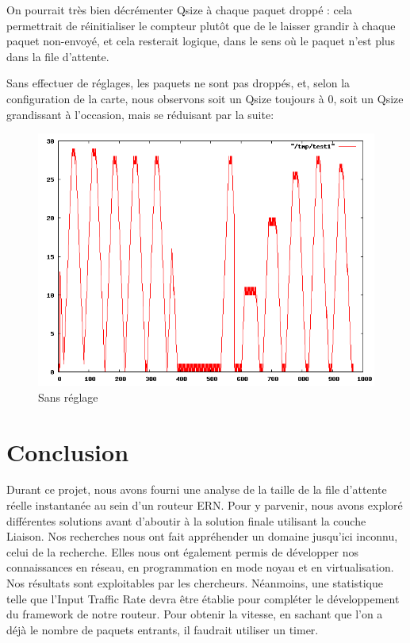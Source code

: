 \documentclass[a4paper]{article}
\begin{document}
On pourrait très bien décrémenter Qsize à chaque paquet droppé : cela
permettrait de réinitialiser le compteur plutôt que de le laisser
grandir à chaque paquet non-envoyé, et cela resterait logique, dans le
sens où le paquet n'est plus dans la file d'attente.

Sans effectuer de  réglages, les paquets ne sont pas droppés, et, selon
la configuration de la carte, nous observons soit un
Qsize toujours à 0, soit un Qsize grandissant à l'occasion, mais se
réduisant par la suite:
\begin{figure}[!ht]
	\centering
	\includegraphics[scale=.5]{qsize_default.png}
	\caption{\label{qsize_default} Sans réglage}
\end{figure}

\section{Conclusion}
Durant ce projet, nous avons fourni une analyse de la taille de la file d'attente
réelle instantanée au sein d'un routeur ERN. Pour y parvenir, nous avons exploré 
différentes solutions avant d'aboutir à la solution finale utilisant la couche Liaison. 
Nos recherches nous ont fait appréhender un domaine jusqu'ici inconnu,
celui de la recherche. Elles nous ont également permis de développer nos connaissances
en réseau, en programmation en mode noyau et en virtualisation. 
Nos résultats sont exploitables par les chercheurs. Néanmoins, une statistique telle que
l'Input Traffic Rate devra être établie pour compléter le développement du framework
de notre routeur. Pour obtenir la vitesse, en sachant que l'on a déjà le nombre
de paquets entrants, il faudrait utiliser un timer.
\end{document}
